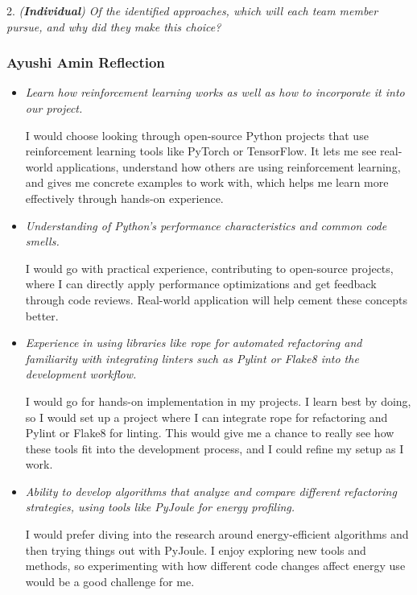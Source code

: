 \documentclass[12pt]{article}
\begin{document}
2. \textit{(\textbf{Individual}) Of the identified approaches, which
will each team member pursue, and why did they make this choice?}

\subsubsection*{Ayushi Amin Reflection}

\medskip

\begin{itemize}[label={}, wide=0pt, leftmargin=*]

  \item \textit{Learn how reinforcement learning works as well as how
    to incorporate it into our project.}

    I would choose looking through open-source Python projects that
    use reinforcement learning tools like PyTorch or TensorFlow. It
    lets me see real-world applications, understand how others are
    using reinforcement learning, and gives me concrete examples to
    work with, which helps me learn more effectively through hands-on
    experience.

  \item \textit{Understanding of Python's performance characteristics
    and common code smells.}

    I would go with practical experience, contributing to open-source
    projects, where I can directly apply performance optimizations
    and get feedback through code reviews. Real-world application
    will help cement these concepts better.

  \item \textit{Experience in using libraries like rope for automated
      refactoring and familiarity with integrating linters such as
    Pylint or Flake8 into the development workflow.}

    I would go for hands-on implementation in my projects. I learn
    best by doing, so I would set up a project where I can integrate
    rope for refactoring and Pylint or Flake8 for linting. This would
    give me a chance to really see how these tools fit into the
    development process, and I could refine my setup as I work.

  \item \textit{Ability to develop algorithms that analyze and
      compare different refactoring strategies, using tools like
    PyJoule for energy profiling.}

    I would prefer diving into the research around energy-efficient
    algorithms and then trying things out with PyJoule. I enjoy
    exploring new tools and methods, so experimenting with how
    different code changes affect energy use would be a good challenge for me.


\end{itemize}
\end{document}
